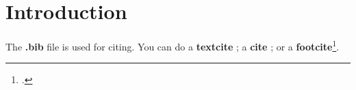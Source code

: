 \section{Introduction}
The \textbf{.bib} file is used for citing. You can do a \textbf{textcite} \textcite{fischer_long-term_1977}; a \textbf{cite} \cite{calvo_staggered_1983}; or a \textbf{footcite}\footcite{taylor_staggered_1979}.

\lipsum[3-7]




